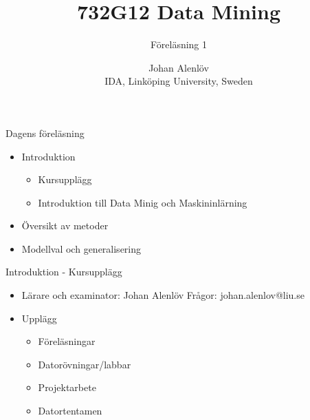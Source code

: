 \documentclass[10pt,english]{beamer}
\title{732G12 Data Mining}
\subtitle{Föreläsning 1}
\date{}
\author{Johan Alenlöv \\ IDA, Linköping University, Sweden}
\begin{document}
\maketitle

\begin{frame}{Dagens föreläsning}
    \begin{itemize}
        \item Introduktion
        \begin{itemize}
            \item Kursupplägg
            \item Introduktion till Data Minig och Maskininlärning
        \end{itemize}
        \item Översikt av metoder
        \item Modellval och generalisering
    \end{itemize}
\end{frame}

\begin{frame}{Introduktion - Kursupplägg}
    \begin{itemize}
        \item Lärare och examinator: Johan Alenlöv
        Frågor: johan.alenlov@liu.se
        \item Upplägg
        \begin{itemize}
            \item Föreläsningar
            \item Datorövningar/labbar
            \item Projektarbete
            \item Datortentamen
        \end{itemize}
    \end{itemize}
    
\end{frame}
\end{document}
